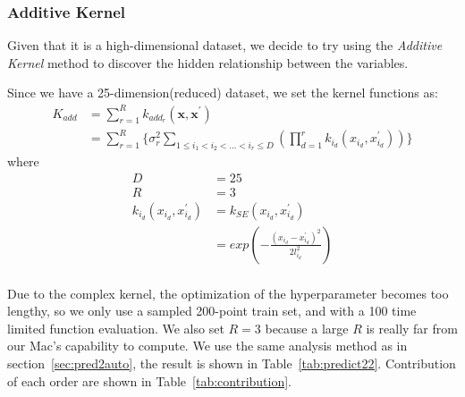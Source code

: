\subsubsection{Additive Kernel}

Given that it is a high-dimensional dataset, we decide to try using the \emph{Additive Kernel} method to discover the hidden relationship between the variables.

Since we have a 25-dimension(reduced) dataset, we set the kernel functions as:
\begin{equation}
\begin{aligned}
K_{add} &= \sum_{r=1}^{R} k_{add_{r}} (\textbf{x},\textbf{x}^{'}) \\
 &= \sum_{r=1}^{R} \{ \sigma^2_r \sum_{1 \leqslant i_1 < i_2 < ... < i_r \leqslant D} ( \prod_{d=1}^{r} k_{i_d} ({x}_{i_d},{x}_{i_d}^{'}) ) \}
\end{aligned}
\end{equation}
where 
\begin{equation}
\begin{aligned}
D &= 25 \\
R &= 3 \\
k_{i_d} ({x}_{i_d},{x}_{i_d}^{'}) &= k_{SE} ({x}_{i_d}, {x}_{i_d}^{'}) \\
&= exp(-\frac{({x}_{i_d}-{x}_{i_d}^{'})^{2}}{2l_{i_d}^{2}})
\end{aligned}
\end{equation}\\
Due to the complex kernel, the optimization of the hyperparameter becomes too lengthy, so we only use a sampled 200-point train set, and with a 100 time limited function evaluation.
We also set $R=3$ because a large $R$ is really far from our Mac's capability to compute.
We use the same analysis method as in section~\ref{sec:pred2auto}, the result is shown in Table~\ref{tab:predict22}.
Contribution of each order are shown in Table~\ref{tab:contribution}.\\


